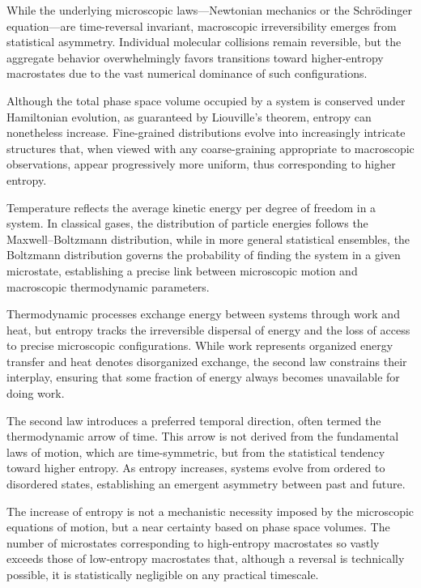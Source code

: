 While the underlying microscopic laws—Newtonian mechanics or the Schrödinger equation—are time-reversal invariant, macroscopic irreversibility emerges from statistical asymmetry. Individual molecular collisions remain reversible, but the aggregate behavior overwhelmingly favors transitions toward higher-entropy macrostates due to the vast numerical dominance of such configurations.

Although the total phase space volume occupied by a system is conserved under Hamiltonian evolution, as guaranteed by Liouville’s theorem, entropy can nonetheless increase. Fine-grained distributions evolve into increasingly intricate structures that, when viewed with any coarse-graining appropriate to macroscopic observations, appear progressively more uniform, thus corresponding to higher entropy.

Temperature reflects the average kinetic energy per degree of freedom in a system. In classical gases, the distribution of particle energies follows the Maxwell–Boltzmann distribution, while in more general statistical ensembles, the Boltzmann distribution governs the probability of finding the system in a given microstate, establishing a precise link between microscopic motion and macroscopic thermodynamic parameters.

Thermodynamic processes exchange energy between systems through work and heat, but entropy tracks the irreversible dispersal of energy and the loss of access to precise microscopic configurations. While work represents organized energy transfer and heat denotes disorganized exchange, the second law constrains their interplay, ensuring that some fraction of energy always becomes unavailable for doing work.

The second law introduces a preferred temporal direction, often termed the thermodynamic arrow of time. This arrow is not derived from the fundamental laws of motion, which are time-symmetric, but from the statistical tendency toward higher entropy. As entropy increases, systems evolve from ordered to disordered states, establishing an emergent asymmetry between past and future.

The increase of entropy is not a mechanistic necessity imposed by the microscopic equations of motion, but a near certainty based on phase space volumes. The number of microstates corresponding to high-entropy macrostates so vastly exceeds those of low-entropy macrostates that, although a reversal is technically possible, it is statistically negligible on any practical timescale.

